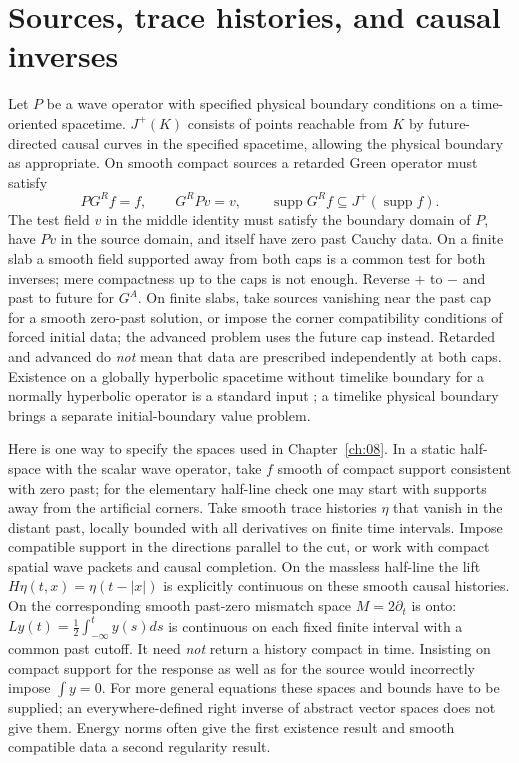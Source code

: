 \section{Sources, trace histories, and causal inverses}
Let $P$ be a wave operator with specified physical boundary conditions on a time-oriented spacetime. $J^+(K)$ consists of points reachable from $K$ by future-directed causal curves in the specified spacetime, allowing the physical boundary as appropriate. On smooth compact sources a retarded Green operator must satisfy
\[
 PG^R f=f,\qquad G^R P v=v,\qquad \operatorname{supp} G^R f\subseteq J^+(\operatorname{supp} f).
\]
The test field $v$ in the middle identity must satisfy the boundary domain of $P$, have $Pv$ in the source domain, and itself have zero past Cauchy data. On a finite slab a smooth field supported away from both caps is a common test for both inverses; mere compactness up to the caps is not enough. Reverse $+$ to $-$ and past to future for $G^A$. On finite slabs, take sources vanishing near the past cap for a smooth zero-past solution, or impose the corner compatibility conditions of forced initial data; the advanced problem uses the future cap instead. Retarded and advanced do \emph{not} mean that data are prescribed independently at both caps. Existence on a globally hyperbolic spacetime without timelike boundary for a normally hyperbolic operator is a standard input \cite{BGP}; a timelike physical boundary brings a separate initial-boundary value problem.

Here is one way to specify the spaces used in Chapter~\ref{ch:08}. In a static half-space with the scalar wave operator, take $f$ smooth of compact support consistent with zero past; for the elementary half-line check one may start with supports away from the artificial corners. Take smooth trace histories $\eta$ that vanish in the distant past, locally bounded with all derivatives on finite time intervals. Impose compatible support in the directions parallel to the cut, or work with compact spatial wave packets and causal completion. On the massless half-line the lift $H\eta(t,x)=\eta(t-|x|)$ is explicitly continuous on these smooth causal histories. On the corresponding smooth past-zero mismatch space $M=2\partial_t$ is onto: $Ly(t)=\tfrac12\int_{-\infty}^t y(s)ds$ is continuous on each fixed finite interval with a common past cutoff. It need \emph{not} return a history compact in time. Insisting on compact support for the response as well as for the source would incorrectly impose $\int y=0$. For more general equations these spaces and bounds have to be supplied; an everywhere-defined right inverse of abstract vector spaces does not give them. Energy norms often give the first existence result and smooth compatible data a second regularity result.

